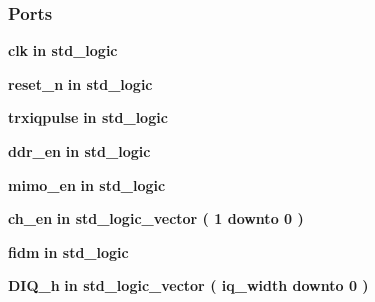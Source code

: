 \subsubsection*{Ports}
 \begin{DoxyCompactItemize}
\item 
{\bf clk}  {\bfseries {\bfseries \textcolor{keywordflow}{in}\textcolor{vhdlchar}{ }}} {\bfseries \textcolor{comment}{std\+\_\+logic}\textcolor{vhdlchar}{ }} 
\item 
{\bf reset\+\_\+n}  {\bfseries {\bfseries \textcolor{keywordflow}{in}\textcolor{vhdlchar}{ }}} {\bfseries \textcolor{comment}{std\+\_\+logic}\textcolor{vhdlchar}{ }} 
\item 
{\bf trxiqpulse}  {\bfseries {\bfseries \textcolor{keywordflow}{in}\textcolor{vhdlchar}{ }}} {\bfseries \textcolor{comment}{std\+\_\+logic}\textcolor{vhdlchar}{ }} 
\item 
{\bf ddr\+\_\+en}  {\bfseries {\bfseries \textcolor{keywordflow}{in}\textcolor{vhdlchar}{ }}} {\bfseries \textcolor{comment}{std\+\_\+logic}\textcolor{vhdlchar}{ }} 
\item 
{\bf mimo\+\_\+en}  {\bfseries {\bfseries \textcolor{keywordflow}{in}\textcolor{vhdlchar}{ }}} {\bfseries \textcolor{comment}{std\+\_\+logic}\textcolor{vhdlchar}{ }} 
\item 
{\bf ch\+\_\+en}  {\bfseries {\bfseries \textcolor{keywordflow}{in}\textcolor{vhdlchar}{ }}} {\bfseries \textcolor{comment}{std\+\_\+logic\+\_\+vector}\textcolor{vhdlchar}{ }\textcolor{vhdlchar}{(}\textcolor{vhdlchar}{ }\textcolor{vhdlchar}{ } \textcolor{vhdldigit}{1} \textcolor{vhdlchar}{ }\textcolor{keywordflow}{downto}\textcolor{vhdlchar}{ }\textcolor{vhdlchar}{ } \textcolor{vhdldigit}{0} \textcolor{vhdlchar}{ }\textcolor{vhdlchar}{)}\textcolor{vhdlchar}{ }} 
\item 
{\bf fidm}  {\bfseries {\bfseries \textcolor{keywordflow}{in}\textcolor{vhdlchar}{ }}} {\bfseries \textcolor{comment}{std\+\_\+logic}\textcolor{vhdlchar}{ }} 
\item 
{\bf D\+I\+Q\+\_\+h}  {\bfseries {\bfseries \textcolor{keywordflow}{in}\textcolor{vhdlchar}{ }}} {\bfseries \textcolor{comment}{std\+\_\+logic\+\_\+vector}\textcolor{vhdlchar}{ }\textcolor{vhdlchar}{(}\textcolor{vhdlchar}{ }\textcolor{vhdlchar}{ }\textcolor{vhdlchar}{ }\textcolor{vhdlchar}{ }{\bfseries {\bf iq\+\_\+width}} \textcolor{vhdlchar}{ }\textcolor{keywordflow}{downto}\textcolor{vhdlchar}{ }\textcolor{vhdlchar}{ } \textcolor{vhdldigit}{0} \textcolor{vhdlchar}{ }\textcolor{vhdlchar}{)}\textcolor{vhdlchar}{ }} 
\item 

\end{DoxyCompactItemize}
